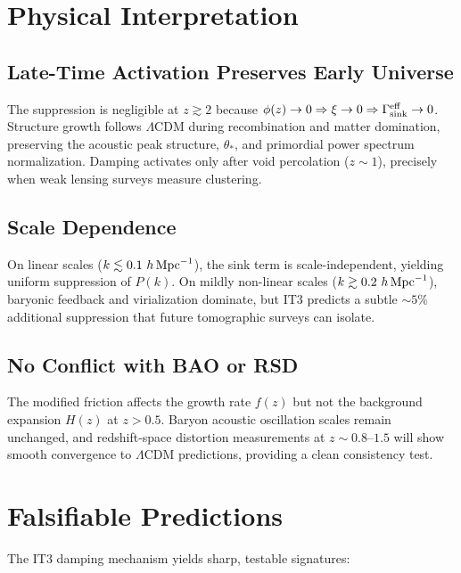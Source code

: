 \documentclass[12pt,a4paper]{article}
\begin{document}
\section{Physical Interpretation}

\subsection{Late-Time Activation Preserves Early Universe}

The suppression is negligible at $z \gtrsim 2$ because $\phi(z) \to 0 \Rightarrow \xi \to 0 \Rightarrow \Gamma_{\rm sink}^{\rm eff} \to 0$. Structure growth follows $\Lambda$CDM during recombination and matter domination, preserving the acoustic peak structure, $\theta_*$, and primordial power spectrum normalization. Damping activates only after void percolation ($z \sim 1$), precisely when weak lensing surveys measure clustering.

\subsection{Scale Dependence}

On linear scales ($k \lesssim 0.1~h\,{\rm Mpc}^{-1}$), the sink term is scale-independent, yielding uniform suppression of $P(k)$. On mildly non-linear scales ($k \gtrsim 0.2~h\,{\rm Mpc}^{-1}$), baryonic feedback and virialization dominate, but IT3 predicts a subtle $\sim 5\%$ additional suppression that future tomographic surveys can isolate.

\subsection{No Conflict with BAO or RSD}

The modified friction affects the growth rate $f(z)$ but not the background expansion $H(z)$ at $z > 0.5$. Baryon acoustic oscillation scales remain unchanged, and redshift-space distortion measurements at $z \sim 0.8$--$1.5$ will show smooth convergence to $\Lambda$CDM predictions, providing a clean consistency test.

\section{Falsifiable Predictions}

The IT3 damping mechanism yields sharp, testable signatures:
\end{document}
